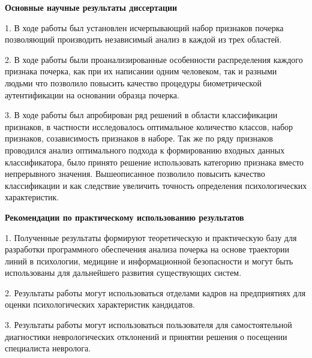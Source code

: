 \bigskip
\bigskip
\textbf{Основные научные результаты диссертации}
\bigskip

1. В ходе работы был установлен исчерпывающий набор признаков почерка позволяющий производить независимый анализ в каждой из трех областей.

2. В ходе работы были проанализированные особенности распределения каждого признака почерка, как при их написании одним человеком, так и разными людьми что позволило повысить качество процедуры биометрической аутентификации на основании образца почерка.

3. В ходе работы был апробирован ряд решений в области классификации признаков, в частности исследовалось оптимальное количество классов, набор признаков, созависимость признаков в наборе. Так же по ряду признаков проводился анализ оптимального подхода к формированию входных данных классификатора, было принято решение использовать категорию признака вместо непрерывного значения. Вышеописанное позволило повысить качество классификации и как следствие увеличить точность определения психологических характеристик.

\bigskip
\textbf{Рекомендации по практическому использованию результатов}
\bigskip

1. Полученные результаты формируют теоретическую и практическую базу для разработки программного обеспечения анализа почерка на основе траектории линий в психологии, медицине и информационной безопасности и могут быть использованы для дальнейшего развития существующих систем.

2. Результаты работы могут использоваться отделами кадров на предприятиях для оценки психологических характеристик кандидатов.

3. Результаты работы могут использоваться пользователя для самостоятельной диагностики неврологических отклонений и принятии решения о посещении специалиста невролога.